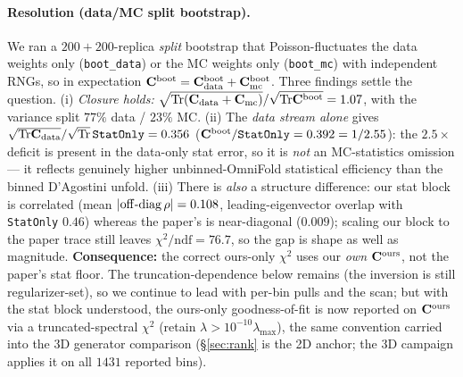 \paragraph{Resolution (data/MC split bootstrap).}
We ran a $200{+}200$-replica \emph{split} bootstrap that Poisson-fluctuates the
data weights only (\texttt{boot\_data}) or the MC weights only (\texttt{boot\_mc})
with independent RNGs, so in expectation
$\mathbf{C}^{\text{boot}}=\mathbf{C}^{\text{boot}}_{\mathrm{data}}+\mathbf{C}^{\text{boot}}_{\mathrm{mc}}$.
Three findings settle the question. (i) \emph{Closure holds:}
$\sqrt{\mathrm{Tr}(\mathbf{C}_{\mathrm{data}}+\mathbf{C}_{\mathrm{mc}})}/
\sqrt{\mathrm{Tr}\mathbf{C}^{\text{boot}}}=1.07$, with the variance split $77\%$ data /
$23\%$ MC. (ii) The \emph{data stream alone} gives
$\sqrt{\mathrm{Tr}\mathbf{C}_{\mathrm{data}}}/\sqrt{\mathrm{Tr}}\,\texttt{StatOnly}=0.356$
($\mathbf{C}^{\text{boot}}/\texttt{StatOnly}=0.392=1/2.55$): the $2.5\times$ deficit is
present in the data-only stat error, so it is \emph{not} an MC-statistics
omission --- it reflects genuinely higher unbinned-OmniFold statistical
efficiency than the binned D'Agostini unfold. (iii) There is \emph{also} a
structure difference: our stat block is correlated (mean
$|{\rm off\text{-}diag}\,\rho|=0.108$, leading-eigenvector overlap with
\texttt{StatOnly} $0.46$) whereas the paper's is near-diagonal ($0.009$); scaling
our block to the paper trace still leaves $\chi^{2}/\mathrm{ndf}=76.7$, so the gap
is shape as well as magnitude. \textbf{Consequence:} the correct ours-only
$\chi^{2}$ uses our \emph{own} $\mathbf{C}^{\text{ours}}$, not the paper's stat floor.
The truncation-dependence below remains (the inversion is still regularizer-set),
so we continue to lead with per-bin pulls and the scan; but with the stat block
understood, the ours-only goodness-of-fit is now reported on $\mathbf{C}^{\text{ours}}$
via a truncated-spectral $\chi^{2}$ (retain $\lambda>10^{-10}\lambda_{\max}$), the
same convention carried into the 3D generator comparison (\S\ref{sec:rank} is the
2D anchor; the 3D campaign applies it on all $1431$ reported bins).

